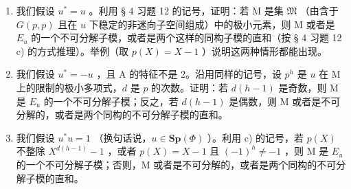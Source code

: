\begin{enumerate}
\def\labelenumi{\alph{enumi})}
\setcounter{enumi}{1}
\item
  我们假设 \(u^{*} = u\) 。利用 § 4 习题 12 的记号，证明：若 M 是集 \(\mathfrak{M}\) （由含于 \(G(p, p)\) 且在 \(u\) 下稳定的非迷向子空间组成）中的极小元素，则 M 或者是 \(E_{u}\) 的一个不可分解子模，或者是两个这样的同构子模的直和（按 § 4 习题 12 c) 的方式推理）。举例（取 \(p(X) = X - 1\) ）说明这两种情形都能出现。
\item
  我们假设 \(u^* = -u\) ，且 A 的特征不是 2。沿用同样的记号，设 \(p^h\) 是 \(u\) 在 M 上的限制的极小多项式，\(d\) 是 \(p\) 的次数。证明：若 \(d(h - 1)\) 是奇数，则 M 是 \(E_u\) 的一个不可分解子模；反之，若 \(d(h - 1)\) 是偶数，则 M 或者是不可分解的，或者是两个同构的不可分解子模的直和。
\item
  我们假设 \(u^{*}u = 1\) （换句话说，\(u \in \mathbf{Sp}(\Phi)\) ）。利用 c) 的记号，若 \(p(X)\) 不整除 \(X^{d(h-1)} - 1\) ，或者 \(p(X) = X - 1\) 且 \((-1)^{h} \neq -1\) ，则 M 是 \(E_{u}\) 的一个不可分解子模；否则，M 或者是不可分解的，或者是两个同构的不可分解子模的直和。
\end{enumerate}

